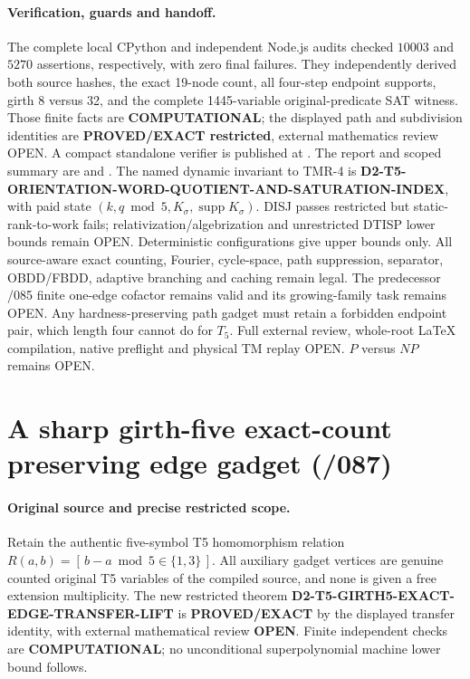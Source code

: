 \documentclass[11pt]{article}
\begin{document}
\paragraph{Verification, guards and handoff.}
The complete local CPython and independent Node.js audits
checked $10003$ and $5270$ assertions, respectively,
with zero final failures. They independently derived both
source hashes, the exact 19-node count, all four-step
endpoint supports, girth 8 versus 32, and the complete
1445-variable original-predicate SAT witness. Those
finite facts are \textbf{COMPUTATIONAL}; the displayed
path and subdivision identities are
\textbf{PROVED/EXACT restricted}, external mathematics
review OPEN. A compact standalone verifier is published
at .
The report and scoped summary are
and
.
The named dynamic invariant to TMR-4 is
\textbf{D2-T5-ORIENTATION-WORD-QUOTIENT-AND-SATURATION-INDEX},
with paid state $(k,q\bmod5,K_\sigma,\operatorname{supp}K_\sigma)$.
DISJ passes restricted but static-rank-to-work fails;
relativization/algebrization and unrestricted DTISP
lower bounds remain OPEN. Deterministic configurations
give upper bounds only. All source-aware exact counting,
Fourier, cycle-space, path suppression, separator,
OBDD/FBDD, adaptive branching and caching remain legal.
The predecessor /085 finite one-edge cofactor remains
valid and its growing-family task remains OPEN. Any
hardness-preserving path gadget must retain a forbidden
endpoint pair, which length four cannot do for $T_5$.
Full external review, whole-root \LaTeX{} compilation,
native preflight and physical TM replay OPEN.
$P$ versus $NP$ remains OPEN.

\section{A sharp girth-five exact-count preserving edge gadget (/087)}
\paragraph{Original source and precise restricted scope.}
Retain the authentic five-symbol T5 homomorphism relation
$R(a,b)=[\,b-a\bmod5\in\{1,3\}\,]$.
All auxiliary gadget vertices are genuine counted original T5
variables of the compiled source, and none is given a free
extension multiplicity.  The new restricted theorem
\textbf{D2-T5-GIRTH5-EXACT-EDGE-TRANSFER-LIFT} is
\textbf{PROVED/EXACT} by the displayed transfer identity,
with external mathematical review \textbf{OPEN}.
Finite independent checks are \textbf{COMPUTATIONAL};
no unconditional superpolynomial machine lower bound follows.
\end{document}
